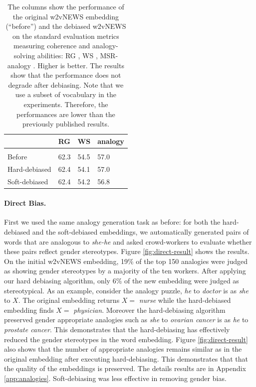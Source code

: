 \documentclass{article}
\begin{document}
\begin{table}
\begin{tabular}{l|lll}
  & RG & WS & analogy  \\
  \hline
  \hline\\
Before  &	62.3& 54.5 & 57.0 \\
Hard-debiased & 62.4	& 54.1 & 57.0\\
Soft-debiased & 62.4 & 54.2 & 56.8 \\
\end{tabular}
	\caption{The columns show the performance of the original 
	w2vNEWS embedding (``before'') and the debiased w2vNEWS on the standard evaluation metrics measuring coherence and analogy-solving abilities: RG \cite{rubenstein1965contextual}, WS \cite{finkelstein2001placing}, MSR-analogy \cite{mikolov2013linguistic}. Higher is better. The results show that the performance does not degrade after debiasing.
	Note that we use a subset of vocabulary in the experiments.   Therefore, 
	the performances are lower than the previously published results.  
	\label{tab:variance}}
\end{table}


\paragraph{Direct Bias.} 
First we used the same analogy generation task as before: 
for both the hard-debiased and the soft-debiased embeddings, we automatically generated pairs of words that are analogous to 
\emph{she-he} and asked crowd-workers to evaluate whether these pairs reflect 
gender stereotypes. Figure \ref{fig:direct-result} shows the results.   
On the initial w2vNEWS embedding, 19\% of the top 150 analogies were judged as 
showing gender stereotypes by a majority of the ten workers.    
After applying our hard debiasing algorithm, only 6\% of the new embedding were 
judged as stereotypical. As an example, consider the analogy puzzle, \emph{he} to \emph{doctor} is as \emph{she} to $X$. The original embedding returns $X = $ \emph{nurse} while the hard-debiased embedding finds $X =$ \emph{physician}. Moreover the hard-debiasing algorithm preserved gender appropriate analogies such as \emph{she} to \emph{ovarian cancer} is as \emph{he} to \emph{prostate cancer}. 
This demonstrates that the hard-debiasing has effectively reduced the gender stereotypes in the word embedding. 
Figure \ref{fig:direct-result} also shows that the number of 
appropriate analogies remains similar as in the original embedding after executing hard-debiasing.  This 
demonstrates that that the quality of the embeddings 
is preserved. The details results are in Appendix \ref{app:analogies}. Soft-debiasing was less effective in removing gender bias. 
\end{document}
